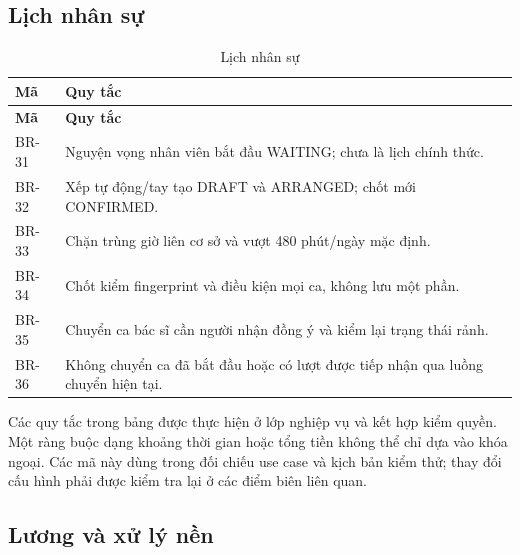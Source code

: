 \subsection{Lịch nhân sự}

{\small\setlength{\tabcolsep}{3pt}\renewcommand{\arraystretch}{1.12}
\begin{longtable}{@{}L{\textwidth-0.72pt\relax} L{\textwidth-5.28pt\relax}@{}}
\caption{Lịch nhân sự}\\
\toprule
\textbf{Mã} & \textbf{Quy tắc}\\\midrule
\endfirsthead
\toprule
\textbf{Mã} & \textbf{Quy tắc}\\\midrule
\endhead
\bottomrule\endlastfoot
BR-31 & Nguyện vọng nhân viên bắt đầu WAITING; chưa là lịch chính thức.\allowbreak{}\\[3pt]
BR-32 & Xếp tự động/\allowbreak{}tay tạo DRAFT và ARRANGED; chốt mới CONFIRMED.\allowbreak{}\\[3pt]
BR-33 & Chặn trùng giờ liên cơ sở và vượt 480 phút/\allowbreak{}ngày mặc định.\allowbreak{}\\[3pt]
BR-34 & Chốt kiểm fingerprint và điều kiện mọi ca, không lưu một phần.\allowbreak{}\\[3pt]
BR-35 & Chuyển ca bác sĩ cần người nhận đồng ý và kiểm lại trạng thái rảnh.\allowbreak{}\\[3pt]
BR-36 & Không chuyển ca đã bắt đầu hoặc có lượt được tiếp nhận qua luồng chuyển hiện tại.\allowbreak{}\\[3pt]
\end{longtable}}
Các quy tắc trong bảng được thực hiện ở lớp nghiệp vụ và kết hợp kiểm quyền.\allowbreak{} Một ràng buộc dạng khoảng thời gian hoặc tổng tiền không thể chỉ dựa vào khóa ngoại.\allowbreak{} Các mã này dùng trong đối chiếu use case và kịch bản kiểm thử; thay đổi cấu hình phải được kiểm tra lại ở các điểm biên liên quan.\allowbreak{}

\clearpage

\subsection{Lương và xử lý nền}

